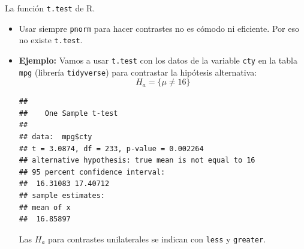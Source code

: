 \documentclass[
  9pt,
  ignorenonframetext,
]{beamer}
\newenvironment{Shaded}{\begin{snugshade}}{\end{snugshade}}
\newcommand{\DataTypeTok}[1]{\textcolor[rgb]{0.13,0.29,0.53}{#1}}
\newcommand{\DecValTok}[1]{\textcolor[rgb]{0.00,0.00,0.81}{#1}}
\newcommand{\FloatTok}[1]{\textcolor[rgb]{0.00,0.00,0.81}{#1}}
\newcommand{\KeywordTok}[1]{\textcolor[rgb]{0.13,0.29,0.53}{\textbf{#1}}}
\newcommand{\NormalTok}[1]{#1}
\newcommand{\OperatorTok}[1]{\textcolor[rgb]{0.81,0.36,0.00}{\textbf{#1}}}
\newcommand{\StringTok}[1]{\textcolor[rgb]{0.31,0.60,0.02}{#1}}
\begin{document}
\begin{frame}[fragile]{La función \texttt{t.test} de R.}
\protect\hypertarget{la-funcion-t.test-de-r.}{}

\begin{itemize}
\item
  Usar siempre \texttt{pnorm} para hacer contrastes no es cómodo ni
  eficiente. Por eso no existe \texttt{t.test}.
\item
  \textbf{Ejemplo:} Vamos a usar \texttt{t.test} con los datos de la
  variable \texttt{cty} en la tabla \texttt{mpg} (librería
  \texttt{tidyverse}) para contrastar la hipótesis alternativa:
  \[H_a =\{\mu \neq 16\}\] \small

\begin{Shaded}
\end{Shaded}

\begin{verbatim}
## 
##    One Sample t-test
## 
## data:  mpg$cty
## t = 3.0874, df = 233, p-value = 0.002264
## alternative hypothesis: true mean is not equal to 16
## 95 percent confidence interval:
##  16.31083 17.40712
## sample estimates:
## mean of x 
##  16.85897
\end{verbatim}

  \normalsize Las \(H_a\) para contrastes unilaterales se indican con
  \texttt{less} y \texttt{greater}.
\end{itemize}

\end{frame}
\end{document}
